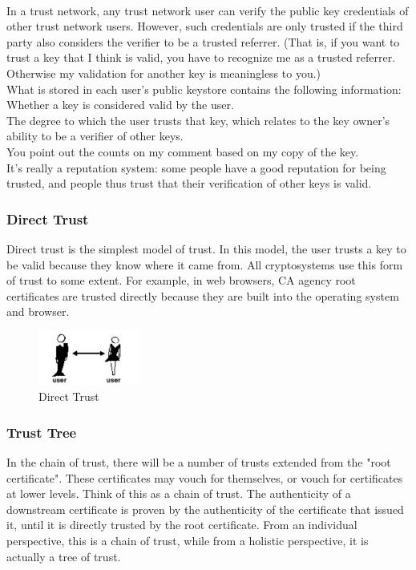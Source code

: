 \\
In a trust network, any trust network user can verify the public key credentials of other 
trust network users. However, such credentials are only trusted if the third party also 
considers the verifier to be a trusted referrer. (That is, if you want to trust a key that 
I think is valid, you have to recognize me as a trusted referrer. Otherwise my validation 
for another key is meaningless to you.)
\\
What is stored in each user's public keystore contains the following information:
\\
Whether a key is considered valid by the user.
\\
The degree to which the user trusts that key, which relates to the key owner's 
ability to be a verifier of other keys.
\\
You point out the counts on my comment based on my copy of the key.
\\
It's really a reputation system: some people have a good reputation for being 
trusted, and people thus trust that their verification of other keys is valid.

\subsubsection{Direct Trust}
Direct trust is the simplest model of trust. In this model, the user trusts a 
key to be valid because they know where it came from\cite{b27}. All cryptosystems use this 
form of trust to some extent. For example, in web browsers, CA agency root 
certificates are trusted directly because they are built into the operating system 
and browser\cite{b28}.

\begin{figure}[H] %
    \centering %
    \includegraphics[width=0.3\textwidth]{figures/directTrust.png} %
    \caption{Direct Trust} %
    \label{Fig.3: Direct Trust} %
    \end{figure}


\subsubsection{Trust Tree}
In the chain of trust, there will be a number of trusts extended from the "root 
certificate". These certificates may vouch for themselves, or vouch for certificates 
at lower levels. Think of this as a chain of trust\cite{b31}. The authenticity of a downstream 
certificate is proven by the authenticity of the certificate that issued it, until 
it is directly trusted by the root certificate. From an individual perspective, this 
is a chain of trust, while from a holistic perspective, it is actually a tree of trust\cite{b28}.

